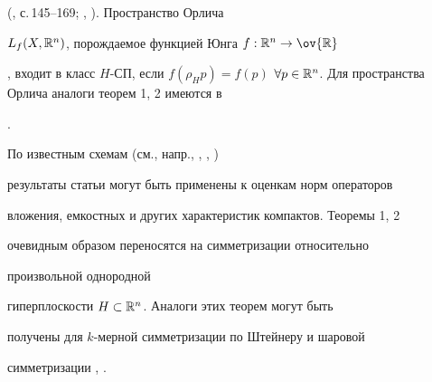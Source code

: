 (\cite{2}, с.\,145--169; \cite{3}, \cite{10}). Пространство Орлича 


$L_f(X,\Bbb R^n)$, порождаемое функцией Юнга $f:\Bbb R^n\to\ov{\Bbb R}$ 


\cite{3}, входит в класс $H$-СП, если $f(\rho_H p)=f(p)$ $\forall 


p\in\Bbb R^n$. Для пространства Орлича аналоги теорем 1, 2 имеются в 


\cite{8}. 


 


По известным схемам (см., напр., \cite{1}, \cite{8}, \cite{12}) 


результаты статьи могут быть применены к оценкам норм операторов 


вложения, емкостных и других характеристик компактов. Теоремы 1, 2 


очевидным образом переносятся на симметризации относительно 


произвольной однородной 


гиперплоскости $H\subset\Bbb R^n$. Аналоги этих теорем могут быть 


получены для $k$-мерной симметризации по Штейнеру \cite{12} и шаровой 


симметризации \cite{1}, \cite{3}. 


 


 


 


 


